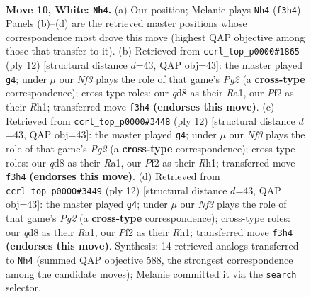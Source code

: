\documentclass[11pt]{article}
\begin{document}
\clearpage

\begin{figure}[p]\centering
\begin{subfigure}{0.46\textwidth}\centering
\resizebox{\linewidth}{!}{%
\newchessgame
\chessboard[
  setfen={rnbqk2r/1p2bp2/4pnp1/p1Pp3p/3P4/2N2N1P/PP3PP1/R1BQKBR1 w Qkq - 0 10},
  showmover=false,
  pgfstyle=straightmove, color=movearrow, markmove={f3-h4}
]}
\caption{}
\end{subfigure}\hfill
\begin{subfigure}{0.46\textwidth}\centering
\resizebox{\linewidth}{!}{%
\newchessgame
\chessboard[
  setfen={rnbqkb1r/1p3ppp/p2ppn2/8/3NP3/2N4P/PPP2PP1/R1BQKB1R w KQkq - 0 7},
  showmover=false,
  pgfstyle=straightmove, color=movearrow, markmove={g2-g4}
]}
\caption{}
\end{subfigure}
\\[4pt]
\begin{subfigure}{0.46\textwidth}\centering
\resizebox{\linewidth}{!}{%
\newchessgame
\chessboard[
  setfen={rnbqkb1r/1p3ppp/p2ppn2/8/3NP3/2N4P/PPP2PP1/R1BQKB1R w KQkq - 0 7},
  showmover=false,
  pgfstyle=straightmove, color=movearrow, markmove={g2-g4}
]}
\caption{}
\end{subfigure}\hfill
\begin{subfigure}{0.46\textwidth}\centering
\resizebox{\linewidth}{!}{%
\newchessgame
\chessboard[
  setfen={rnbqkb1r/1p3ppp/p2ppn2/8/3NP3/2N4P/PPP2PP1/R1BQKB1R w KQkq - 0 7},
  showmover=false,
  pgfstyle=straightmove, color=movearrow, markmove={g2-g4}
]}
\caption{}
\end{subfigure}
\caption{\textbf{Move 10, White: \texttt{Nh4}.} (a) Our position; Melanie plays \texttt{Nh4} (\texttt{f3h4}). Panels (b)--(d) are the retrieved master positions whose correspondence most drove this move (highest QAP objective among those that transfer to it). (b) Retrieved from \texttt{ccrl\_top\_p0000\#1865} (ply 12) [structural distance $d$=43, QAP obj=43]: the master played \texttt{g4}; under $\mu$ our \emph{Nf3} plays the role of that game's \emph{Pg2} (a \textbf{cross-type} correspondence); cross-type roles: our \emph{q}d8 as their \emph{R}a1, our \emph{P}f2 as their \emph{R}h1; transferred move \texttt{f3h4} \textbf{(endorses this move)}. (c) Retrieved from \texttt{ccrl\_top\_p0000\#3448} (ply 12) [structural distance $d$=43, QAP obj=43]: the master played \texttt{g4}; under $\mu$ our \emph{Nf3} plays the role of that game's \emph{Pg2} (a \textbf{cross-type} correspondence); cross-type roles: our \emph{q}d8 as their \emph{R}a1, our \emph{P}f2 as their \emph{R}h1; transferred move \texttt{f3h4} \textbf{(endorses this move)}. (d) Retrieved from \texttt{ccrl\_top\_p0000\#3449} (ply 12) [structural distance $d$=43, QAP obj=43]: the master played \texttt{g4}; under $\mu$ our \emph{Nf3} plays the role of that game's \emph{Pg2} (a \textbf{cross-type} correspondence); cross-type roles: our \emph{q}d8 as their \emph{R}a1, our \emph{P}f2 as their \emph{R}h1; transferred move \texttt{f3h4} \textbf{(endorses this move)}. Synthesis: 14 retrieved analogs transferred to \texttt{Nh4} (summed QAP objective 588, the strongest correspondence among the candidate moves); Melanie committed it via the \texttt{search} selector.}
\label{fig:thought-m18}
\end{figure}
\end{document}
